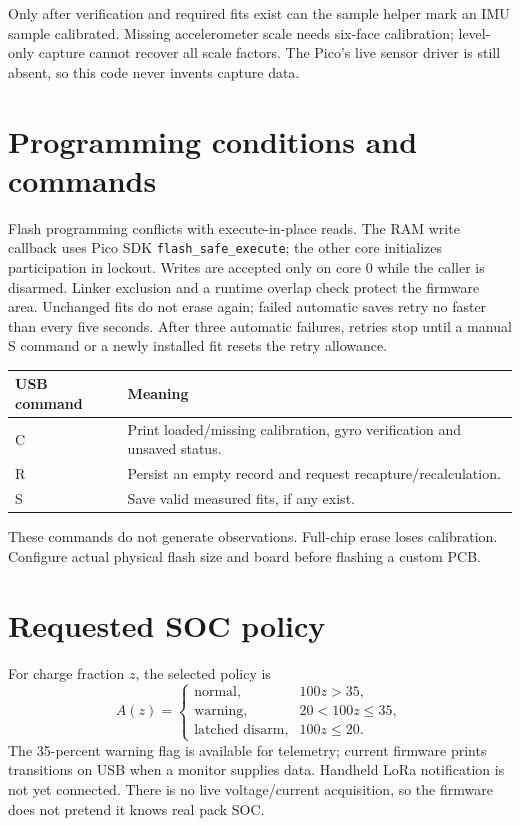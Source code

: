 Only after verification and required fits exist can the sample helper mark an
IMU sample calibrated. Missing accelerometer scale needs six-face calibration;
level-only capture cannot recover all scale factors. The Pico's live sensor
driver is still absent, so this code never invents capture data.

\section{Programming conditions and commands}
Flash programming conflicts with execute-in-place reads. The RAM write callback
uses Pico SDK \texttt{flash\_safe\_execute}; the other core initializes participation
in lockout. Writes are accepted only on core 0 while the caller is disarmed.
Linker exclusion and a runtime overlap check protect the firmware area.
Unchanged fits do not erase again; failed automatic saves retry no faster than
every five seconds. After three automatic failures, retries stop until a manual
S command or a newly installed fit resets the retry allowance.

\begin{center}\begin{tabular}{@{}lp{.75\linewidth}@{}}\toprule
USB command & Meaning\\\midrule
C & Print loaded/missing calibration, gyro verification and unsaved status.\\
R & Persist an empty record and request recapture/recalculation.\\
S & Save valid measured fits, if any exist.\\\bottomrule
\end{tabular}\end{center}
These commands do not generate observations. Full-chip erase loses calibration.
Configure actual physical flash size and board before flashing a custom PCB.

\section{Requested SOC policy}
For charge fraction $z$, the selected policy is
\begin{equation}
A(z)=\begin{cases}
\text{normal},&100z>35,\\
\text{warning},&20<100z\le35,\\
\text{latched disarm},&100z\le20.
\end{cases}
\end{equation}
The 35-percent warning flag is available for telemetry; current firmware prints
transitions on USB when a monitor supplies data. Handheld LoRa notification is
not yet connected. There is no live voltage/current acquisition, so the firmware
does not pretend it knows real pack SOC.

